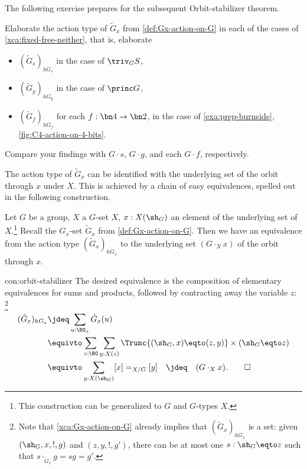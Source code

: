 The following exercise prepares for the subsequent Orbit-stabilizer theorem.

\begin{xca}\label{xca:fixed-free-neither-action-types}
Elaborate the action type of $\tilde G_x$ from \cref{def:Gx-action-on-G}
in each of the cases of \cref{xca:fixed-free-neither}, that is, elaborate
\begin{itemize}
\item $(\tilde G_s)_{hG_s}$ in the case of $\triv_G S$,
\item $(\tilde G_g)_{hG_g}$ in the case of $\princ G$, 
\item $(\tilde G_f)_{hG_f}$ for each $f:\bn4\to\bn2$,
in the case of \cref{exa:prep-burnside}, \cref{fig:C4-action-on-4-bits}.
\end{itemize}
Compare your findings with $G \cdot s$, $G \cdot g$,
and each $G \cdot f$, respectively.
\end{xca}

The action type of $\tilde G_x$ can be identified with the 
underlying set of the orbit through $x$ under $X$. This is 
achieved by a chain of easy equivalences, spelled
out in the following construction.

\begin{construction}
  \label{con:orbit-stabilizer}
  Let $G$ be a group, $X$ a $G$-set $X$,
  $x : X(\sh_G)$ an element of the underlying set of $X$.\footnote{%
  This construction can be generalized to \inftygps $G$ and $G$-types $X$.}
  Recall the $G_x$-set $\tilde G_x$ from \cref{def:Gx-action-on-G}.
  Then we have an equivalence from the action type $(\tilde G_x)_{hG_x}$
  to the underlying set $(G\cdot_X x)$ of the orbit through $x$.
\end{construction}
\begin{implementation}{con:orbit-stabilizer}
  The desired equivalence is the composition of elementary equivalences
  for sums and products, followed by contracting away the variable $z$:
\footnote{\label{ft:action-type-tildeGx-set} 
Note that \cref{xca:Gx-action-on-G} already
implies that $(\tilde G_x)_{hG_x}$ is a set:
given $(\sh_G,x,!,g)$ and $(z,y,!,g')$, there can be at most
one $s : \sh_G \eqto z$ such that $s\cdot_{\tilde G_x} g = sg = g'$. 
}
  \begin{align*}
    (\tilde G_x)_{hG_x}
    &\jdeq \sum_{u : \BG_x}\tilde G_x(u) \\
    &\equivto \sum_{z:\BG}\sum_{y:X(z)}
    \Trunc{(\sh_G,x) \eqto (z,y)}\times (\sh_G \eqto z) \\
    &\equivto \sum_{y:X(\sh_G)}[x] =_{X/G} [y]\quad\jdeq\quad(G\cdot_X x).\qedhere
  \end{align*}
\end{implementation}

